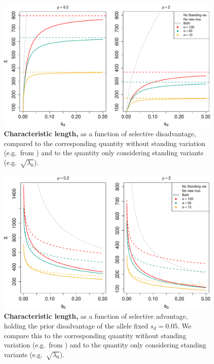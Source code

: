 \documentclass{article}
\begin{document}
\begin{figure}[ht]
\begin{center}
  \includegraphics[width=1.0\textwidth]{G6PD_charlengths}   %
\caption{ %
{\bf Characteristic length,} as a function of selective disadvantage, compared to the corresponding quantity without standing variation (e.g.\ from \cite{ralphcoop2010}) and to the quantity only considering standing variants (e.g.\ $\sqrt{\lambda_0}$).
} \label{Fig-G6PD-charlength}
\end{center}
\end{figure}

\begin{figure}[ht]
\begin{center}
  \includegraphics[width=1.0\textwidth]{G6PD_charlengths_sb}   %
\caption{ %
{\bf Characteristic length,} as a function of selective advantage,
holding the prior disadvantage of the allele fixed $s_d=0.05$. 
We compare this to the corresponding quantity without standing variation (e.g.\ from \cite{ralphcoop2010}) and to the quantity only considering standing variants (e.g.\ $\sqrt{\lambda_0}$).
} \label{Fig-G6PD-charlength-sb}
\end{center}
\end{figure}
\end{document}

